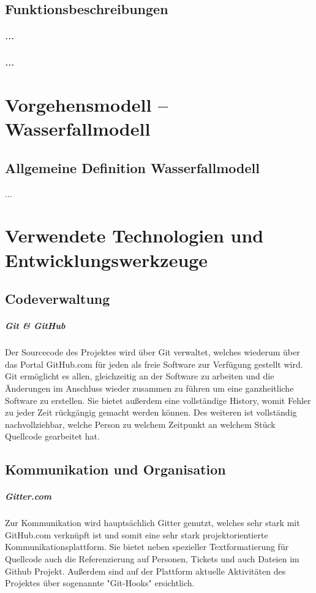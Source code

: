 \documentclass[11pt]{scrreprt}
\begin{document}
\section{Funktionsbeschreibungen}
\paragraph{...}


\paragraph{...}


\chapter{Vorgehensmodell – Wasserfallmodell}
\section{Allgemeine Definition Wasserfallmodell}

...


\newpage

\chapter{Verwendete Technologien und Entwicklungswerkzeuge}
\section{Codeverwaltung}
\paragraph{Git \& GitHub}
Der Sourcecode des Projektes wird über Git verwaltet, welches wiederum über das Portal GitHub.com für jeden als freie Software zur Verf\"ugung gestellt wird.
Git ermöglicht es allen, gleichzeitig an der Software zu arbeiten und die \"Anderungen im Anschluss wieder zusammen zu f\"uhren um eine ganzheitliche Software zu erstellen. Sie bietet außerdem eine vollst\"andige History, womit Fehler zu jeder Zeit r\"uckg\"angig gemacht werden k\"onnen.
Des weiteren ist vollst\"andig nachvollziehbar, welche Person zu welchem Zeitpunkt an welchem St\"uck Quellcode gearbeitet hat.

\section{Kommunikation und Organisation}
\paragraph{Gitter.com}
Zur Kommunikation wird haupts\"achlich Gitter genutzt, welches sehr stark mit GitHub.com verkn\"upft ist und somit eine sehr stark projektorientierte Kommunikationsplattform. Sie bietet neben spezieller Textformatierung f\"ur Quellcode auch die Referenzierung auf Personen, Tickets und auch Dateien im Github Projekt. Außerdem sind auf der Plattform aktuelle Aktivit\"aten des Projektes \"uber sogenannte "Git-Hooks" ersichtlich.
\end{document}
